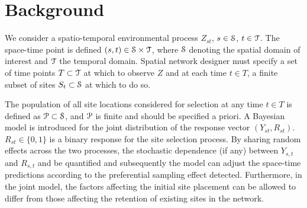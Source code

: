 \section{Background}
We consider a spatio-temporal environmental process $Z_{st}$, $s\in \mathcal{S}$, $t\in \mathcal{T}$.
The space-time point is defined $(s, t) \in \mathcal{S} \times \mathcal{T}$, where $\mathcal{S}$ denoting the spatial 
domain of interest and $\mathcal{T}$ the temporal domain. 
Spatial network designer must specify a set of time points $T \subset \mathcal{T}$ at which to observe
$Z$ and at each time $t \in T$, a finite subset of sites $S_t \subset \mathcal{S}$ at which to do so.

The population of all site locations considered for selection at any time $t \in T$ is defined as 
$\mathcal{P} \subset \mathcal{S}$, and $\mathcal{P}$ is finite and should be specified a priori. 
A Bayesian model is introduced for the joint distribution of the response vector $(Y_{st}, R_{st})$.
$R_{st} \in \{0, 1\}$ is a binary response for the site selection process.
By sharing random effects across the two processes, the stochastic dependence (if any) between 
$Y_{s, t}$ and $R_{s, t}$ and be quantified and subsequently the model can adjust the space-time
predictions according to the preferential sampling effect detected.
Furthermore, in the joint model, the factors affecting the initial site placement can be allowed to
differ from those affecting the retention of existing sites in the network.

